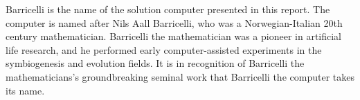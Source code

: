 Barricelli is the name of the solution computer presented in this report.
The computer is named after Nils Aall Barricelli, who was a Norwegian-Italian 20th century mathematician.
Barricelli the mathematician was a pioneer in artificial life research, and he performed early computer-assisted experiments in the symbiogenesis and evolution fields.
It is in recognition of Barricelli the mathematicians's groundbreaking seminal work that Barricelli the computer takes its name.
